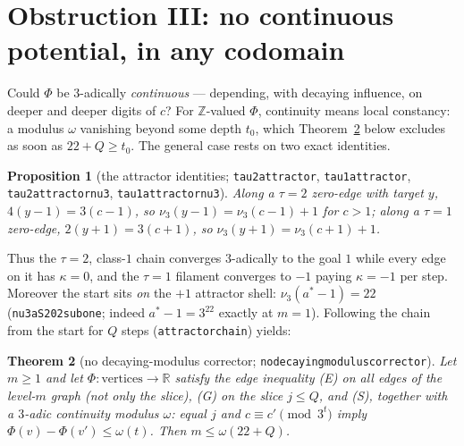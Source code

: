\documentclass[11pt]{amsart}
\newtheorem{theorem}{Theorem}[section]
\newtheorem{proposition}[theorem]{Proposition}
\theoremstyle{definition}
\theoremstyle{remark}
\newcommand{\lean}[1]{{\def\_{\textunderscore\allowbreak}\texttt{#1}}}
\newcommand{\Z}{\mathbb{Z}}
\newcommand{\R}{\mathbb{R}}
\newcommand{\nuthree}{\nu_3}
\begin{document}
\section{Obstruction III: no continuous potential, in any codomain}
\label{sec:continuity}

Could $\Phi$ be $3$-adically \emph{continuous} --- depending, with decaying
influence, on deeper and deeper digits of $c$?  For $\Z$-valued $\Phi$,
continuity means local constancy: a modulus $\omega$ vanishing beyond some
depth $t_0$, which Theorem~\ref{thm:nogo-cont} below excludes as soon as
$22 + Q \ge t_0$.  The general case rests on two exact identities.

\begin{proposition}[the attractor identities; \lean{tau2\_attractor},
\lean{tau1\_attractor}, \lean{tau2\_attractor\_nu3}, \lean{tau1\_attractor\_nu3}]
Along a $\tau=2$ zero-edge with target $y$, $4(y-1) = 3(c-1)$, so
$\nuthree(y-1) = \nuthree(c-1)+1$ for $c > 1$; along a $\tau=1$ zero-edge,
$2(y+1) = 3(c+1)$, so $\nuthree(y+1) = \nuthree(c+1)+1$.
\end{proposition}

Thus the $\tau{=}2$, class-$1$ chain converges $3$-adically to the goal $1$
while every edge on it has $\kappa = 0$, and the $\tau{=}1$ filament
converges to $-1$ paying $\kappa = -1$ per step.  Moreover the start sits
\emph{on} the $+1$ attractor shell: $\nuthree(a^{*}-1) = 22$
(\lean{nu3\_aS202\_sub\_one}; indeed $a^{*} - 1 = 3^{22}$ exactly at $m=1$).
Following the chain from the start for $Q$ steps
(\lean{attractor\_chain}) yields:

\begin{theorem}[no decaying-modulus corrector; \lean{no\_decaying\_modulus\_corrector}]
\label{thm:nogo-cont}
Let $m \ge 1$ and let $\Phi:\text{vertices} \to \R$ satisfy the edge
inequality (E) on \emph{all} edges of the level-$m$ graph (not only the
slice), (G) on the slice $j \le Q$, and (S), together with a $3$-adic
continuity modulus $\omega$: equal $j$ and $c \equiv c' \pmod{3^t}$ imply
$\Phi(v)-\Phi(v') \le \omega(t)$.  Then $m \le \omega(22+Q)$.
\end{theorem}
\end{document}
